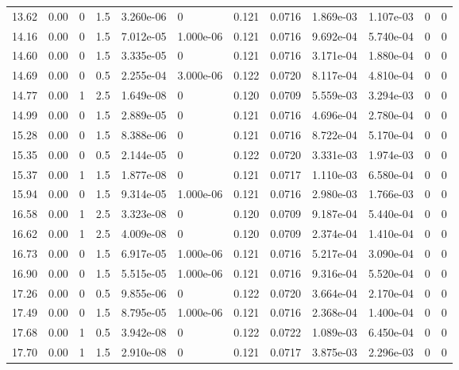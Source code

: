 \documentclass[preview]{standalone}
\begin{document}
{{{\begin{tabular}{L{1.2cm}C{1.2cm} C{0.3cm}C{0.5cm} C{1.4cm}C{1.4cm} C{1.4cm}C{1.4cm} C{1.6cm}C{1.6cm} C{1.6cm}C{1.6cm}}
  13.62  &  0.00  & 0     & 1.5 &  3.260e-06  & 0  &  0.121&   0.0716& 1.869e-03 & 1.107e-03   &  0 & 0  \\ 
  14.16  &  0.00  & 0     & 1.5 &  7.012e-05  & 1.000e-06  &  0.121&   0.0716& 9.692e-04 & 5.740e-04   &  0 & 0  \\ 
  14.60  &  0.00  & 0     & 1.5 &  3.335e-05  & 0  &  0.121&   0.0716& 3.171e-04 & 1.880e-04   &  0 & 0  \\ 
  14.69  &  0.00  & 0     & 0.5 &  2.255e-04  & 3.000e-06  &  0.122&   0.0720& 8.117e-04 & 4.810e-04   &  0 & 0  \\ 
  14.77  &  0.00  & 1     & 2.5 &  1.649e-08  & 0  &  0.120&   0.0709& 5.559e-03 & 3.294e-03   &  0 & 0  \\ 
  14.99  &  0.00  & 0     & 1.5 &  2.889e-05  & 0  &  0.121&   0.0716& 4.696e-04 & 2.780e-04   &  0 & 0  \\ 
  15.28  &  0.00  & 0     & 1.5 &  8.388e-06  & 0  &  0.121&   0.0716& 8.722e-04 & 5.170e-04   &  0 & 0  \\ 
  15.35  &  0.00  & 0     & 0.5 &  2.144e-05  & 0  &  0.122&   0.0720& 3.331e-03 & 1.974e-03   &  0 & 0  \\ 
  15.37  &  0.00  & 1     & 1.5 &  1.877e-08  & 0  &  0.121&   0.0717& 1.110e-03 & 6.580e-04   &  0 & 0  \\ 
  15.94  &  0.00  & 0     & 1.5 &  9.314e-05  & 1.000e-06  &  0.121&   0.0716& 2.980e-03 & 1.766e-03   &  0 & 0  \\ 
  16.58  &  0.00  & 1     & 2.5 &  3.323e-08  & 0  &  0.120&   0.0709& 9.187e-04 & 5.440e-04   &  0 & 0  \\ 
  16.62  &  0.00  & 1     & 2.5 &  4.009e-08  & 0  &  0.120&   0.0709& 2.374e-04 & 1.410e-04   &  0 & 0  \\ 
  16.73  &  0.00  & 0     & 1.5 &  6.917e-05  & 1.000e-06  &  0.121&   0.0716& 5.217e-04 & 3.090e-04   &  0 & 0  \\ 
  16.90  &  0.00  & 0     & 1.5 &  5.515e-05  & 1.000e-06  &  0.121&   0.0716& 9.316e-04 & 5.520e-04   &  0 & 0  \\ 
  17.26  &  0.00  & 0     & 0.5 &  9.855e-06  & 0  &  0.122&   0.0720& 3.664e-04 & 2.170e-04   &  0 & 0  \\ 
  17.49  &  0.00  & 0     & 1.5 &  8.795e-05  & 1.000e-06  &  0.121&   0.0716& 2.368e-04 & 1.400e-04   &  0 & 0  \\ 
  17.68  &  0.00  & 1     & 0.5 &  3.942e-08  & 0  &  0.122&   0.0722& 1.089e-03 & 6.450e-04   &  0 & 0  \\ 
  17.70  &  0.00  & 1     & 1.5 &  2.910e-08  & 0  &  0.121&   0.0717& 3.875e-03 & 2.296e-03   &  0 & 0  \\ 

\end{tabular}}}}
\end{document}
